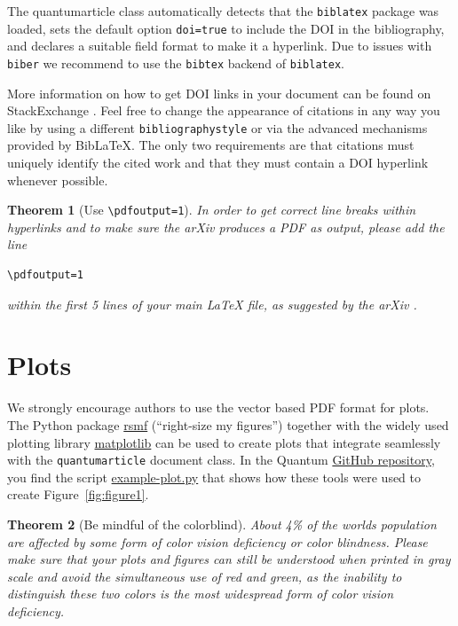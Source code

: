 \documentclass[a4paper,twocolumn,11pt,accepted=2017-05-09]{quantumarticle}
\newtheorem{theorem}{Theorem}
\begin{document}
The quantumarticle class automatically detects that the \texttt{biblatex} package was loaded, sets the default option \texttt{doi=true} to include the DOI in the bibliography, and declares a suitable field format to make it a hyperlink.
Due to issues with \texttt{biber} we recommend to use the \texttt{bibtex} backend of \texttt{biblatex}.

More information on how to get DOI links in your document can be found on StackExchange \cite{howtogetdoilinksinbibliography,automaticallyaddingdoifieldstoahandmadebibliography}.
Feel free to change the appearance of citations in any way you like by using a different \texttt{bibliographystyle} or via the advanced mechanisms provided by BibLaTeX.
The only two requirements are that citations must uniquely identify the cited work and that they must contain a DOI hyperlink whenever possible.

\begin{theorem}[Use \texttt{\textbackslash pdfoutput=1}]
  In order to get correct line breaks within hyperlinks and to make sure the arXiv produces a PDF as output, please add the line
\begin{verbatim}
\pdfoutput=1
\end{verbatim}
  within the first 5 lines of your main LaTeX file, as suggested by the arXiv \cite{arxivpdfoutput}.
\end{theorem}

\section{Plots}
\label{sec:plots}
We strongly encourage authors to use the vector based PDF format for plots. The Python package \href{https://pypi.org/project/rsmf/}{rsmf} (``right-size my figures'') together with the widely used plotting library \href{https://matplotlib.org/}{matplotlib} can be used to create plots that integrate seamlessly with the \texttt{quantumarticle} document class. In the Quantum \href{https://github.com/quantum-journal/quantum-journal/}{GitHub repository}, you find the script \href{https://raw.githubusercontent.com/quantum-journal/quantum-journal/master/example-plot.py}{example-plot.py} that shows how these tools were used to create Figure~\ref{fig:figure1}.


\begin{theorem}[Be mindful of the colorblind]
  About 4\% of the worlds population are affected by some form of color vision deficiency or color blindness.
  Please make sure that your plots and figures can still be understood when printed in gray scale and avoid the simultaneous use of red and green, as the inability to distinguish these two colors is the most widespread form of color vision deficiency.
\end{theorem}
\end{document}
